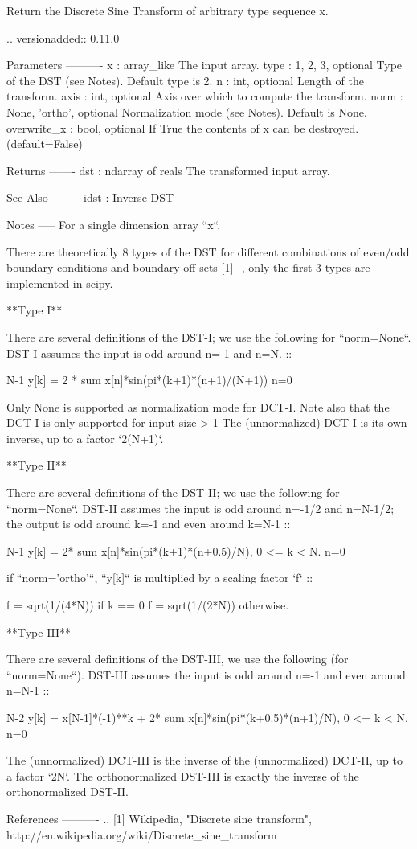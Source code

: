 \begin{DoxyVerb}Return the Discrete Sine Transform of arbitrary type sequence x.

.. versionadded:: 0.11.0

Parameters
----------
x : array_like
    The input array.
type : {1, 2, 3}, optional
    Type of the DST (see Notes). Default type is 2.
n : int, optional
    Length of the transform.
axis : int, optional
    Axis over which to compute the transform.
norm : {None, 'ortho'}, optional
    Normalization mode (see Notes). Default is None.
overwrite_x : bool, optional
    If True the contents of x can be destroyed. (default=False)

Returns
-------
dst : ndarray of reals
    The transformed input array.

See Also
--------
idst : Inverse DST

Notes
-----
For a single dimension array ``x``.

There are theoretically 8 types of the DST for different combinations of
even/odd boundary conditions and boundary off sets [1]_, only the first
3 types are implemented in scipy.

**Type I**

There are several definitions of the DST-I; we use the following
for ``norm=None``.  DST-I assumes the input is odd around n=-1 and n=N. ::

             N-1
  y[k] = 2 * sum x[n]*sin(pi*(k+1)*(n+1)/(N+1))
             n=0

Only None is supported as normalization mode for DCT-I. Note also that the
DCT-I is only supported for input size > 1
The (unnormalized) DCT-I is its own inverse, up to a factor `2(N+1)`.

**Type II**

There are several definitions of the DST-II; we use the following
for ``norm=None``.  DST-II assumes the input is odd around n=-1/2 and
n=N-1/2; the output is odd around k=-1 and even around k=N-1 ::

            N-1
  y[k] = 2* sum x[n]*sin(pi*(k+1)*(n+0.5)/N), 0 <= k < N.
            n=0

if ``norm='ortho'``, ``y[k]`` is multiplied by a scaling factor `f` ::

    f = sqrt(1/(4*N)) if k == 0
    f = sqrt(1/(2*N)) otherwise.

**Type III**

There are several definitions of the DST-III, we use the following
(for ``norm=None``).  DST-III assumes the input is odd around n=-1
and even around n=N-1 ::

                             N-2
  y[k] = x[N-1]*(-1)**k + 2* sum x[n]*sin(pi*(k+0.5)*(n+1)/N), 0 <= k < N.
                             n=0

The (unnormalized) DCT-III is the inverse of the (unnormalized) DCT-II, up
to a factor `2N`.  The orthonormalized DST-III is exactly the inverse of
the orthonormalized DST-II.

References
----------
.. [1] Wikipedia, "Discrete sine transform",
       http://en.wikipedia.org/wiki/Discrete_sine_transform\end{DoxyVerb}
